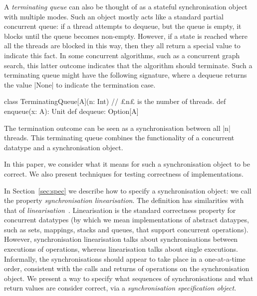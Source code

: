 A \emph{terminating queue} can also be thought of as a stateful
synchronisation object with multiple modes.  Such an object mostly acts like a
standard partial concurrent queue: if a thread attempts to dequeue, but the
queue is empty, it blocks until the queue becomes non-empty.  However, if a
state is reached where all the threads are blocked in this way, then they all
return a special value to indicate this fact.  In some concurrent algorithms,
such as a concurrent graph search, this latter outcome indicates that the
algorithm should terminate.  Such a terminating queue might have the following
signature, where a dequeue returns the value |None| to indicate the
termination case.
%
\begin{scala}
class TerminatingQueue[A](n: Int){ // £n£ is the number of threads.   
  def enqueue(x: A): Unit
  def dequeue: Option[A]
}
\end{scala} 
%
The termination outcome can be seen as a synchronisation between all |n|
threads.  This terminating queue combines the functionality of a
concurrent datatype and a synchronisation object.



In this paper, we consider what it means for such a synchronisation
object to be correct.  We also present techniques for testing correctness of
implementations.

In Section~\ref{sec:spec} we describe how to specify a synchronisation object:
we call the property \emph{synchronisation linearisation}.  The definition has
similarities with that of
\emph{linearisation}~\cite{herlihy-wing,herlihy-shavit}.  Linearisation is the
standard correctness property for concurrent datatypes (by which we mean
implementations of abstract dataypes, such as sets, mappings, stacks and
queues, that support concurrent operations).  However, synchronisation
linearisation talks about synchronisations between executions of operations,
whereas linearisation talks about single executions.  Informally, the
synchronisations should appear to take place in a one-at-a-time order,
consistent with the calls and returns of operations on the synchronisation
object.
We present a way to specify what sequences of synchronisations and what
return values are consider correct, via a \emph{synchronisation specification
  object}.

